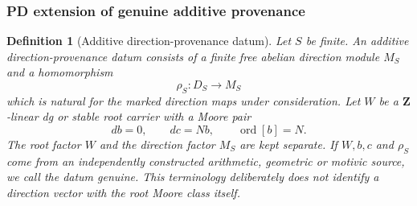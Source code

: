 \documentclass[11pt]{article}
\newtheorem{definition}[theorem]{Definition}
\theoremstyle{remark}
\newcommand{\Z}{\mathbf Z}
\providecommand{\Ord}{\operatorname{Ord}}
\renewcommand{\Ord}{\operatorname{ord}}
\begin{document}
\subsubsection{PD extension of genuine additive provenance}

\begin{definition}[Additive direction-provenance datum]\label{P1C-def:additive-direction-provenance}
Let $S$ be finite.  An \emph{additive direction-provenance datum} consists of a finite free abelian direction module $M_S$ and a homomorphism
\[
 \rho_S:D_S\longrightarrow M_S
\]
which is natural for the marked direction maps under consideration.  Let $W$ be a $\Z$-linear dg or stable root carrier with a Moore pair
\[
 db=0,\qquad dc=Nb,\qquad \Ord[b]=N.
\]
The root factor $W$ and the direction factor $M_S$ are kept separate.  If $W,b,c$ and $\rho_S$ come from an independently constructed arithmetic, geometric or motivic source, we call the datum \emph{genuine}.  This terminology deliberately does not identify a direction vector with the root Moore class itself.
\end{definition}
\end{document}
